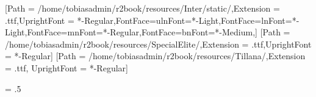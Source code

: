 \newcommand\xpath{/home/tobiasadmin/r2book}

\usepackage[
  paper=a4paper,
  layout=a4paper,
  top=25mm,
  bottom=22mm,
  left=25mm,
  right=25mm,
  marginparsep=5mm,
  marginparwidth=20mm,
  head=7.5mm,
  foot=8mm
  ]{geometry}


\usepackage{fontspec}
\setmainfont{Inter}[Path = /home/tobiasadmin/r2book/resources/Inter/static/,Extension = .ttf,UprightFont = *-Regular,FontFace={ul}{n}{Font=*-Light},FontFace={l}{n}{Font=*-Light},FontFace={m}{n}{Font=*-Regular},FontFace={b}{n}{Font=*-Medium},]
\DeclareRobustCommand{\ulseries}{\fontseries{ul}\selectfont}
\DeclareRobustCommand{\lseries}{\fontseries{l}\selectfont}
\DeclareRobustCommand{\mseries}{\fontseries{m}\selectfont}
\DeclareRobustCommand{\mbseries}{\fontseries{mb}\selectfont}
\DeclareRobustCommand{\bseries}{\fontseries{b}\selectfont}
\DeclareRobustCommand{\ebseries}{\fontseries{eb}\selectfont}
\DeclareTextFontCommand{\textul}{\ulseries}
\DeclareTextFontCommand{\textl}{\lseries}
\DeclareTextFontCommand{\textm}{\mseries}
\DeclareTextFontCommand{\textmb}{\mbseries}
\DeclareTextFontCommand{\textb}{\bseries}
\DeclareTextFontCommand{\texteb}{\ebseries}
\setsansfont{SpecialElite}[Path = /home/tobiasadmin/r2book/resources/SpecialElite/,Extension = .ttf,UprightFont = *-Regular]
[Path = /home/tobiasadmin/r2book/resources/Tillana/,Extension = .ttf, UprightFont = *-Regular]

\linespread{1.075}
\parskip = .5\baselineskip

\makeatletter
\def\@maketitle{%
  \newpage
  \null
  \vskip -\topskip%
  \begin{center}%
    {\strut\LARGE\sffamily \@title \par}%
    \vskip 2\baselineskip%
  \end{center}}
\makeatother

\usepackage{lastpage}

\newcommand\thexex{0}
\newcommand\xex[1]{\renewcommand\thexex{#1}}

\let\paragraph\oldparagraph
\let\subparagraph\oldsubparagraph

\usepackage{titlesec}

